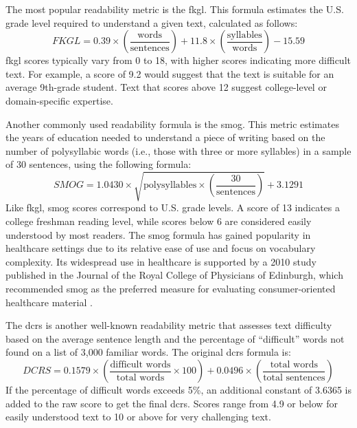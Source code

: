 The most popular readability metric is the \gls{fkgl}. This formula estimates the U.S. grade level required to understand a given text, calculated as follows:
$$FKGL = 0.39 \times \left(\frac{\text{words}}{\text{sentences}}\right) + 11.8 \times \left(\frac{\text{syllables}}{\text{words}}\right) - 15.59$$
\gls{fkgl} scores typically vary from 0 to 18, with higher scores indicating more difficult text. For example, a score of 9.2 would suggest that the text is suitable for an average 9th-grade student. Text that scores above 12 suggest college-level or domain-specific expertise.

Another commonly used readability formula is the \gls{smog}. 
This metric estimates the years of education needed to understand a piece of writing based on the number of polysyllabic words (i.e., those with three or more syllables) in a sample of 30 sentences, using the following formula:
$$SMOG = 1.0430 \times \sqrt{\text{polysyllables} \times \left(\frac{30}{\text{sentences}}\right)} + 3.1291$$
Like \gls{fkgl}, \gls{smog} scores correspond to U.S. grade levels. A score of 13 indicates a college freshman reading level, while scores below 6 are considered easily understood by most readers. The \gls{smog} formula has gained popularity in healthcare settings due to its relative ease of use and focus on vocabulary complexity. Its widespread use in healthcare is supported by a 2010 study published in the Journal of the Royal College of Physicians of Edinburgh, which recommended \gls{smog} as the preferred measure for evaluating consumer-oriented healthcare material \cite{Fitzsimmons2010-mq}.

The \gls{dcrs} is another well-known readability metric that assesses text difficulty based on the average sentence length and the percentage of ``difficult'' words not found on a list of 3,000 familiar words. The original \gls{dcrs} formula is:
$$DCRS = 0.1579 \times \left(\frac{\text{difficult words}}{\text{total words}} \times 100\right) + 0.0496 \times \left(\frac{\text{total words}}{\text{total sentences}}\right)$$
If the percentage of difficult words exceeds 5\%, an additional constant of 3.6365 is added to the raw score to get the final \gls{dcrs}. Scores range from 4.9 or below for easily understood text to 10 or above for very challenging text.

